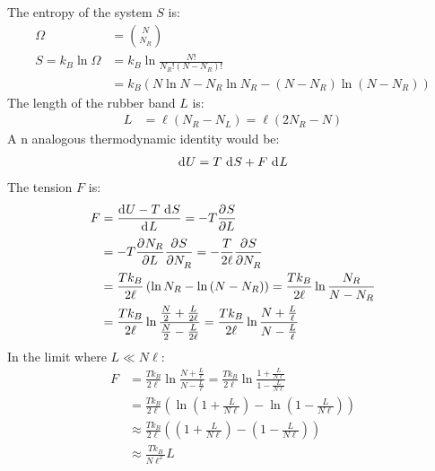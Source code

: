 \documentclass{article}
\begin{document}
The entropy of the system $S$ is:
\begin{equation}
    \begin{split}
        \Omega & = {N \choose N_R} \\
        S = k_B\ln\Omega & = k_B\ln\frac{N!}{N_R!\left(N - N_R\right)!} \\
        & = k_B\left(N\ln N - N_R\ln N_R - \left(N - N_R\right)\ln\left(N - N_R\right)\right)
    \end{split}
\end{equation}
The length of the rubber band $L$ is:
\begin{equation}
    \begin{split}
        L & = \ell\left(N_R - N_L\right) = \ell\left(2N_R - N\right)
    \end{split}
\end{equation}
A
n analogous thermodynamic identity would be:
\begin{equation}
    \begin{split}
        \diff{U} & = T \, \diff{S} + F \, \diff{L} \\
    \end{split}
\end{equation}
The tension $F$ is:
\begin{equation}
    \begin{split}
        F & = \frac{\diff{U} - T \, \diff{S}}{\diff{L}} = -T\pderiv{S}{L} \\
        & = -T\pderiv{N_R}{L}\pderiv{S}{N_R} = -\frac{T}{2\ell}\pderiv{S}{N_R} \\
        & = \frac{Tk_B}{2\ell}\left(\ln N_R - \ln\left(N - N_R\right)\right) = \frac{Tk_B}{2\ell}\ln \frac{N_R}{N - N_R} \\
        & = \frac{Tk_B}{2\ell}\ln \frac{\frac{N}{2} + \frac{L}{2\ell}}{\frac{N}{2} - \frac{L}{2\ell}} = \frac{Tk_B}{2\ell}\ln \frac{N + \frac{L}{\ell}}{N - \frac{L}{\ell}}
    \end{split}
\end{equation}
In the limit where $L \ll N\ell$:
\begin{equation}
    \begin{split}
        F & = \frac{Tk_B}{2\ell}\ln \frac{N + \frac{L}{\ell}}{N - \frac{L}{\ell}} = \frac{Tk_B}{2\ell}\ln \frac{1 + \frac{L}{N\ell}}{1 - \frac{L}{N\ell}} \\
        & = \frac{Tk_B}{2\ell}\left(\ln \left(1 + \frac{L}{N\ell}\right) - \ln\left(1 - \frac{L}{N\ell}\right)\right) \\
        & \approx \frac{Tk_B}{2\ell}\left(\left(1 + \frac{L}{N\ell}\right) - \left(1 - \frac{L}{N\ell}\right)\right) \\
        & \approx \frac{Tk_B}{N\ell^2}L
    \end{split}
\end{equation}
\end{document}

